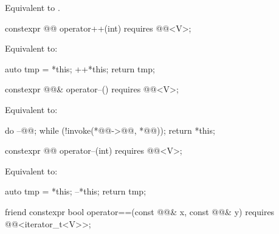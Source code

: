 \begin{itemdescr}
\pnum
\effects
Equivalent to .
\end{itemdescr}

%
\begin{itemdecl}
constexpr @@ operator++(int) requires @@<V>;
\end{itemdecl}

\begin{itemdescr}
\pnum
\effects
Equivalent to:
\begin{codeblock}
auto tmp = *this;
++*this;
return tmp;
\end{codeblock}
\end{itemdescr}

%
\begin{itemdecl}
constexpr @@& operator--() requires @@<V>;
\end{itemdecl}

\begin{itemdescr}
\pnum
\effects
Equivalent to:
\begin{codeblock}
do
  --@@;
while (!invoke(*@@->@@, *@@));
return *this;
\end{codeblock}
\end{itemdescr}

%
\begin{itemdecl}
constexpr @@ operator--(int) requires @@<V>;
\end{itemdecl}

\begin{itemdescr}
\pnum
\effects
Equivalent to:
\begin{codeblock}
auto tmp = *this;
--*this;
return tmp;
\end{codeblock}
\end{itemdescr}

%
\begin{itemdecl}
friend constexpr bool operator==(const @@& x, const @@& y)
  requires @@<iterator_t<V>>;
\end{itemdecl}

